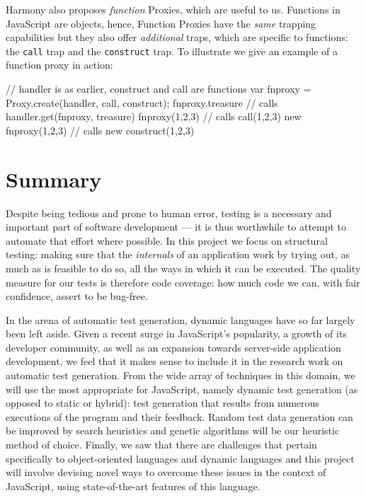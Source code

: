 Harmony also proposes \emph{function} Proxies, which are useful to us. Functions in JavaScript are objects, hence, Function Proxies have the \emph{same} trapping capabilities but they also offer \emph{additional} traps, which are specific to functions: the \texttt{call} trap and the \texttt{construct} trap. To illustrate we give an example of a function proxy in action:

\begin{code}

// handler is as earlier, construct and call are functions
var fnproxy = Proxy.create(handler, call, construct);
fnproxy.treasure   // calls handler.get(fnproxy, treasure)
fnproxy(1,2,3)     // calls call(1,2,3)
new fnproxy(1,2,3) // calls new construct(1,2,3)

\end{code}

\section{Summary}

Despite being tedious and prone to human error, testing is a necessary and important part of software development --- it is thus worthwhile to attempt to automate that effort where possible. In this project we focus on structural testing: making sure that the \emph{internals} of an application work by trying out, as much as is feasible to do so, all the ways in which it can be executed. The quality measure for our tests is therefore code coverage: how much code we can, with fair confidence, assert to be bug-free.

In the arena of automatic test generation, dynamic languages have so far largely been left aside. Given a recent surge in JavaScript's popularity, a growth of its developer community, as well as an expansion towards server-side application development, we feel that it makes sense to include it in the research work on automatic test generation. From the wide array of techniques in this domain, we will use the most appropriate for JavaScript, namely dynamic test generation (as opposed to static or hybrid): test generation that results from numerous executions of the program and their feedback. Random test data generation can be improved by search heuristics and genetic algorithms will be our heuristic method of choice. Finally, we saw that there are challenges that pertain specifically to object-oriented languages and dynamic languages and this project will involve devising novel ways to overcome these issues in the context of JavaScript, using state-of-the-art features of this language.
